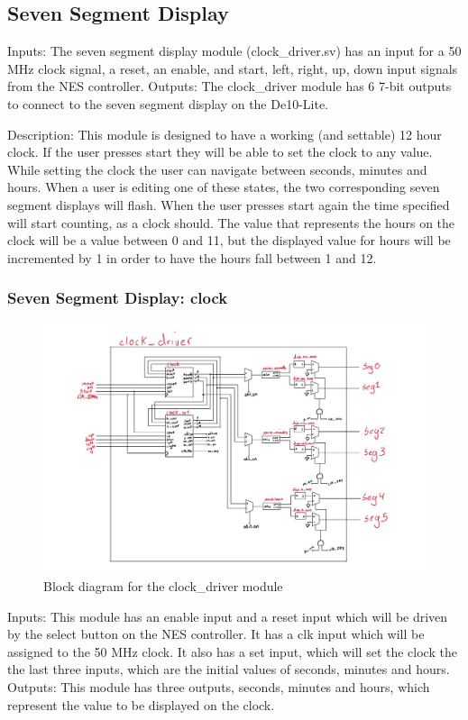 \documentclass[a4paper]{article}
\begin{document}
\subsection{Seven Segment Display}
Inputs: The seven segment display module (clock\_driver.sv) has an input for a 50 MHz clock signal, a reset, an enable, and start, left, right, up, down input signals from the NES controller.
Outputs: The clock_driver module has 6 7-bit outputs to connect to the seven segment display on the De10-Lite.

Description: This module is designed to have a working (and settable) 12 hour clock. If the user presses start they will be able to set the clock to any value. While setting the clock the user can navigate between seconds, minutes and hours. When a user is editing one of these states, the two corresponding seven segment displays will flash. When the user presses start again the time specified will start counting, as a clock should. The value that represents the hours on the clock will be a value between 0 and 11, but the displayed value for hours will be incremented by 1 in order to have the hours fall between 1 and 12.

\subsubsection{Seven Segment Display: clock}
\begin{figure}[H]
    \includegraphics[width=0.8 \linewidth]{images/clock_driver.JPG}
    \caption{Block diagram for the clock_driver module}
    \label{clock_driver}
\end{figure}

Inputs: This module has an enable input and a reset input which will be driven by the select button on the NES controller. It has a clk input which will be assigned to the 50 MHz clock. It also has a set input, which will set the clock the the last three inputs, which are the initial values of seconds, minutes and hours.
Outputs: This module has three outputs, seconds, minutes and hours, which represent the value to be displayed on the clock.
\end{document}

